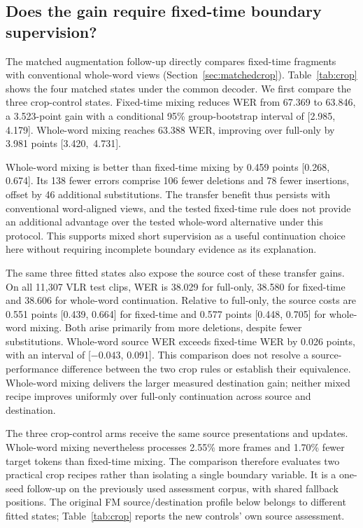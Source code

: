 \subsection{Does the gain require fixed-time boundary supervision?}
\label{sec:cropresults}
The matched augmentation follow-up directly compares fixed-time fragments with
conventional whole-word views (Section~\ref{sec:matchedcrop}). Table~\ref{tab:crop}
shows the four matched states under the common decoder. We first compare the
three crop-control states. Fixed-time mixing
reduces WER from 67.369 to 63.846, a 3.523-point gain with a conditional
95\% group-bootstrap interval of [2.985, 4.179]. Whole-word mixing reaches
63.388 WER, improving over full-only by 3.981 points \mbox{[3.420, 4.731]}.



Whole-word mixing is better than fixed-time mixing by 0.459 points
[0.268, 0.674]. Its 138 fewer errors comprise 106 fewer deletions and 78 fewer
insertions, offset by 46 additional substitutions. The transfer benefit thus
persists with conventional word-aligned views, and the tested fixed-time rule
does not provide an additional advantage over the tested whole-word alternative
under this protocol. This supports mixed short supervision
as a useful continuation choice here without requiring incomplete boundary
evidence as its explanation.

The same three fitted states also expose the source cost of these transfer
gains. On all 11,307 VLR test clips, WER is 38.029 for full-only, 38.580 for
fixed-time and 38.606 for whole-word continuation. Relative to full-only,
the source costs are 0.551 points [0.439, 0.664] for fixed-time and
0.577 points [0.448, 0.705] for whole-word mixing. Both arise primarily from
more deletions, despite fewer substitutions. Whole-word source WER exceeds
fixed-time WER by 0.026 points, with an interval of [$-0.043$, 0.091].
This comparison does not resolve a source-performance difference between the
two crop rules or establish their equivalence. Whole-word mixing delivers the
larger measured destination gain; neither mixed recipe improves uniformly
over full-only continuation across source and destination.

The three crop-control arms receive the same source presentations and updates. Whole-word
mixing nevertheless processes 2.55\% more frames and 1.70\% fewer target tokens
than fixed-time mixing. The comparison therefore evaluates two practical crop
recipes rather than isolating a single boundary variable. It is a one-seed
follow-up on the previously used assessment corpus, with shared fallback
positions. The original FM source/destination profile below belongs to different
fitted states; Table~\ref{tab:crop} reports the new controls' own source assessment.

